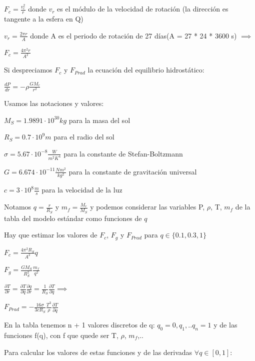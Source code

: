 \documentclass[10pt]{book}
\begin{document}
$F_c = \frac {v_r^2}{r}$ donde $v_r$ es el módulo de la velocidad de rotación (la dirección es tangente a la esfera en Q)

$v_r = \frac{2 \pi r}{A} $ donde A es el periodo de rotación de 27 días(A = 27 * 24 * 3600 s) $\implies$

$F_c = \frac {4 \pi^2 r}{A^2}$

Si despreciamos $F_c$ y  $F_{Prad}$ la ecuación del equilibrio hidrostático:

$ \frac{d P}{d r} = -\rho \frac{G M_r}{r^2}$

Usamos las notaciones y valores:
\begin{description}
\item $M_S = 1.9891 \cdot 10^{30} kg$ para la masa del sol
\item $R_S = 0.7 \cdot 10^9 m$ para el radio del sol
\item $\sigma = 5.67 \cdot 10^{-8} \frac{W}{m^2 K^4}$ para la constante de Stefan-Boltzmann
\item $G = 6.674 \cdot 10^{-11} \frac{N m^2}{kg^2}$ para la constante de gravitación universal
\item $c = 3 \cdot 10^{8} \frac{m}{s}$ para la velocidad de la luz

\end{description}

Notamos $q = \frac{r}{R_S}$ y $m_f = \frac{M_r}{M_S}$ 
y podemos considerar las variables P, $\rho$, T, $m_f$ de la tabla del modelo estándar como funciones de $q$

Hay que estimar los valores de $F_c$, $F_g$ y $F_{Prad}$ para  $q \in \{0.1, 0.3, 1\}$

$F_c = \frac {4 \pi^2 R_S}{A^2} q$
 

$F_g = \frac {G M_S}{R_S^2} \frac{m_f}{q^2} $

$\frac {\partial T}{\partial r} = \frac {\partial T}{\partial q}   \frac {\partial q}{\partial r} =  \frac {1}{R_S}  \frac {\partial T}{\partial q} \implies $

$F_{Prad} = -\frac {16 \sigma}{3 c R_S} \frac {T^3}{\rho} \frac {\partial T}{\partial q}$

En la tabla tenemos n + 1 valores discretos de q: $q_0=0, q_1, .. q_n = 1$
y de las funciones f(q), con f que quede ser T, $\rho$, $m_f$,.. 
 
Para calcular los valores de estas funciones y de las derivadas $\forall q \in [0,1]$:
\end{document}
